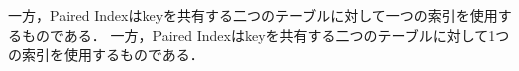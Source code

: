 一方，Paired Indexはkeyを共有する二つのテーブルに対して一つの索引を使用するものである．
一方，Paired Indexはkeyを共有する二つのテーブルに対して1つの索引を使用するものである．

